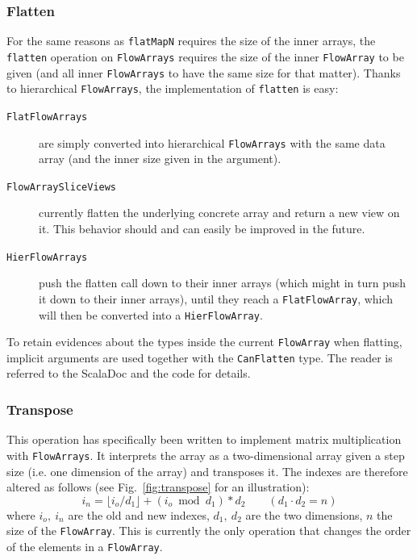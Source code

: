 \documentclass[runningheads,a4paper,fleqn]{llncs}
\begin{document}
\subsubsection{Flatten}
For the same reasons as \texttt{flatMapN} requires the size of the
inner arrays, the \texttt{flatten} operation on \texttt{FlowArrays} requires
the size of the inner \texttt{FlowArray} to be given (and all inner \texttt{FlowArrays}
to have the same size for that matter). Thanks to hierarchical
\texttt{FlowArrays}, the implementation of \texttt{flatten} is easy:

\begin{description}
\item[\texttt{FlatFlowArrays}] are simply converted into hierarchical
  \texttt{FlowArrays} with the same data array (and the inner size given in the
  argument).
\item[\texttt{FlowArraySliceViews}] currently flatten the underlying
  concrete array and return a new view on it. This behavior should and
  can easily be improved in the future.
\item[\texttt{HierFlowArrays}] push the flatten call down to their
  inner arrays (which might in turn push it down to their inner
  arrays), until they reach a \texttt{FlatFlowArray}, which will then
  be converted into a \texttt{HierFlowArray}.
\end{description}

To retain evidences about the types inside the current \texttt{FlowArray} when
flatting, implicit arguments are used together with the
\texttt{CanFlatten} type. The reader is referred to the ScalaDoc and
the code for details.

\subsubsection{Transpose}
This operation has specifically been written to implement matrix
multiplication with \texttt{FlowArrays}. It interprets the array as a
two-dimensional array given a step size (i.e. one dimension of the
array) and transposes it. The indexes are therefore altered as
follows (see Fig.~\ref{fig:transpose} for an illustration):
\[ i_n = \lfloor i_o / d_1 \rfloor + (i_o \bmod d_1) * d_2 \qquad (d_1
\cdot d_2 = n)\]
where $i_o,\ i_n$ are the old and new indexes, $d_1,\ d_2$ are the two
dimensions, $n$ the size of the \texttt{FlowArray}. This is currently the only
operation that changes the order of the elements in a \texttt{FlowArray}.
\end{document}
